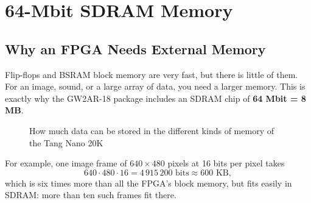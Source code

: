 \chapter{64-Mbit SDRAM Memory}
\label{ch:sdram}

\section{Why an FPGA Needs External Memory}

Flip-flops and BSRAM block memory are very fast, but there is little of them.
For an image, sound, or a large array of data, you need a larger memory. This
is exactly why the GW2AR-18 package includes an SDRAM chip of
\textbf{64 Mbit = 8 MB}.

\begin{figure}[H]
\centering
{}
\caption{How much data can be stored in the different kinds of memory of the Tang Nano 20K}
\end{figure}

For example, one image frame of $640\times480$ pixels at 16 bits per pixel
takes
\[
  640 \cdot 480 \cdot 16 = 4\,915\,200 \text{ bits} \approx 600 \text{ KB},
\]
which is six times more than all the FPGA's block memory, but fits easily in
SDRAM: more than ten such frames fit there.

